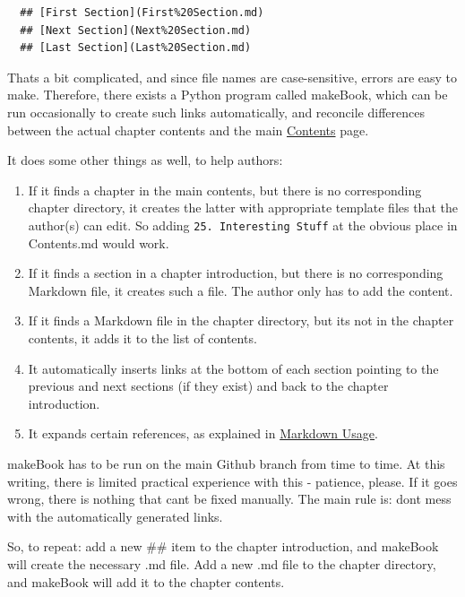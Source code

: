 \documentclass[
]{article}
\begin{document}
\begin{verbatim}
  ## [First Section](First%20Section.md)
  ## [Next Section](Next%20Section.md)
  ## [Last Section](Last%20Section.md)
\end{verbatim}

That\textquotesingle s a bit complicated, and since file names are
case-sensitive, errors are easy to make. Therefore, there exists a
Python program called makeBook, which can be run occasionally to create
such links automatically, and reconcile differences between the actual
chapter contents and the main \hyperref[list-of-contents]{Contents}
page.

It does some other things as well, to help authors:

\begin{enumerate}
\def\labelenumi{\arabic{enumi}.}
\item
  If it finds a chapter in the main contents, but there is no
  corresponding chapter directory, it creates the latter with
  appropriate template files that the author(s) can edit. So adding
  \texttt{25.\ Interesting\ Stuff} at the obvious place in Contents.md
  would work.
\item
  If it finds a section in a chapter introduction, but there is no
  corresponding Markdown file, it creates such a file. The author only
  has to add the content.
\item
  If it finds a Markdown file in the chapter directory, but
  it\textquotesingle s not in the chapter contents, it adds it to the
  list of contents.
\item
  It automatically inserts links at the bottom of each section pointing
  to the previous and next sections (if they exist) and back to the
  chapter introduction.
\item
  It expands certain references, as explained in
  \hyperref[markdown-usage]{Markdown Usage}.
\end{enumerate}

makeBook has to be run on the main Github branch from time to time. At
this writing, there is limited practical experience with this -
patience, please. If it goes wrong, there is nothing that
can\textquotesingle t be fixed manually. The main rule is:
don\textquotesingle t mess with the automatically generated links.

So, to repeat: add a new \#\# item to the chapter introduction, and
makeBook will create the necessary .md file. Add a new .md file to the
chapter directory, and makeBook will add it to the chapter contents.
\end{document}
